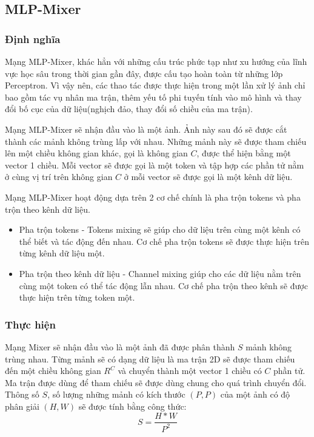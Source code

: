 \subsection{MLP-Mixer}
\subsubsection*{Định nghĩa}
Mạng MLP-Mixer, khác hẳn với những cấu trúc phức tạp như xu hướng của lĩnh vực học sâu trong thời gian gần đây, được cấu tạo hoàn toàn từ những lớp Perceptron. Vì vậy nên, các thao tác được thực hiện trong một lần xử lý ảnh chỉ bao gồm tác vụ nhân ma trận, thêm yếu tố phi tuyến tính vào mô hình và thay đổi bố cục của dữ liệu(nghịch đảo, thay đổi số chiều của ma trận).

Mạng MLP-Mixer sẽ nhận đầu vào là một ảnh. Ảnh này sau đó sẽ được cắt thành các mảnh không trùng lấp với nhau. Những mảnh này sẽ được tham chiếu lên một chiều không gian khác, gọi là không gian $C$, được thể hiện bằng một vector 1 chiều. Mỗi vector sẽ được gọi là một token và tập hợp các phần tử nằm ở cùng vị trí trên không gian $C$ ở mỗi vector sẽ được gọi là một kênh dữ liệu.

Mạng MLP-Mixer hoạt động dựa trên 2 cơ chế chính là pha trộn tokens và pha trộn theo kênh dữ liệu.
\begin{itemize}
  \item Pha trộn tokens - Tokens mixing sẽ giúp cho dữ liệu trên cùng một kênh có thể biết và tác động đến nhau. Cơ chế pha trộn tokens sẽ được thực hiện trên từng kênh dữ liệu một.
  \item Pha trộn theo kênh dữ liệu - Channel mixing giúp cho các dữ liệu nằm trên cùng một token có thể tác động lẫn nhau. Cơ chế pha trộn theo kênh sẽ được thực hiện trên từng token một.
\end{itemize}

\subsubsection*{Thực hiện}
Mạng Mixer sẽ nhận đầu vào là một ảnh đã được phân thành $S$ mảnh không trùng nhau. Từng mảnh sẽ có dạng dữ liệu là ma trận 2D sẽ được tham chiếu đến một chiều không gian $R^{C}$ và chuyển thành một vector 1 chiều có $C$ phần tử. Ma trận được dùng để tham chiếu sẽ được dùng chung cho quá trình chuyển đổi. Thông số $S$, số lượng những mảnh có kích thước $(P,P)$ của một ảnh có độ phân giải $(H,W)$ sẽ được tính bằng công thức:
\begin{equation}
  S = \frac{H*W}{P^{2}}
\end{equation}

